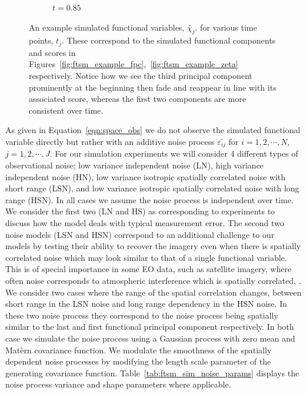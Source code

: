 \begin{figure}
\begin{subfigure}[b]{0.45\textwidth}
		\caption{$t=0.85$}
	\end{subfigure}
	\caption[An example simulated functional variables at various times.]{An example simulated functional variables, $\bar{\chi}_j$. for various time points, $t_j$. These correspond to the simulated functional components and scores in Figures~\ref{fig:ftsm_example_fpc},~\ref{fig:ftsm_example_zeta} respectively. Notice how we see the third principal component prominently at the beginning then fade and reappear in line with its associated score, whereas the first two components are more consistent over time.}
	\label{fig:ftsm_chi_example}
\end{figure}

As given in Equation~\eqref{eqn:space_obs} we do not observe the simulated functional variable directly but rather with an additive noise process $\bar{\varepsilon_{ij}}$ for $i=1,2,\cdots, N$, $j=1,2,\cdots, J$.
For our simulation experiments we will consider 4 different types of observational noise; low variance independent noise (LN), high variance independent noise (HN), low variance isotropic spatially correlated noise with short range (LSN), and low variance isotropic spatially correlated noise with long range (HSN).
In all cases we assume the noise process is independent over time. 
We consider the first two (LN and HS) as corresponding to experiments to discuss how the model deals with typical measurement error. 
The second two noise models (LSN and HSN) correspond to an additional challenge to our models by testing their ability to recover the imagery even when there is spatially correlated noise which may look similar to that of a single functional variable. 
This is of special importance in some EO data, such as satellite imagery, where often noise corresponds to atmospheric interference which is spatially correlated, \citep{oliver_understanding_2004}. 
We consider two cases where the range of the spatial correlation changes, between short range in the LSN noise and long range
 dependency in the HSN noise. 
In these two noise process they correspond to the noise process being spatially similar to the last and first functional principal component respectively.
 In both case we simulate the noise process using a Gaussian process with zero mean and  Mat\`{e}rn covariance function. 
 We modulate the smoothness of the spatially dependent noise processes by modifying  the length scale parameter of the generating covariance function.
 Table~\ref{tab:ftsm_sim_noise_params} displays the noise process variance and shape parameters where applicable. 
 
